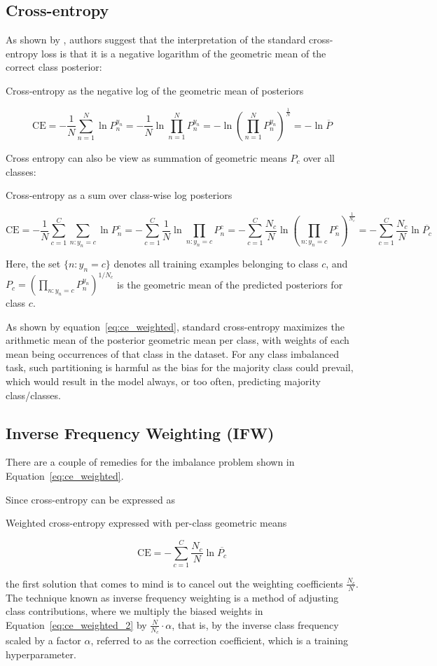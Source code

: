 \subsection{Cross-entropy}
As shown by \cite{dynamic_loss_balancing}, authors suggest that the interpretation of the standard cross-entropy loss is that it is a negative logarithm of the geometric mean of the correct class posterior:
\begin{myequation}
\caption{Cross-entropy as the negative log of the geometric mean of posteriors}
\label{eq:ce_geom}
\[
\text{CE} = -\frac{1}{N} \sum_{n=1}^{N} \ln P_n^{y_n} 
= -\frac{1}{N} \ln \prod_{n=1}^{N} P_n^{y_n} 
= -\ln \left( \prod_{n=1}^{N} P_n^{y_n} \right)^{\frac{1}{N}} 
= -\ln \overline{P}
\]
\end{myequation}


Cross entropy can also be view as summation of geometric means $P_c$ over all classes:
\begin{myequation}
\caption{Cross-entropy as a sum over class-wise log posteriors}
\label{eq:ce_weighted}
\[
\text{CE} = -\frac{1}{N} \sum_{c=1}^{C} \sum_{n: y_n = c} \ln P_n^c 
= -\sum_{c=1}^{C} \frac{1}{N} \ln \prod_{n: y_n = c} P_n^c 
= -\sum_{c=1}^{C} \frac{N_c}{N} \ln \left( \prod_{n: y_n = c} P_n^c \right)^{\frac{1}{N_c}} 
= -\sum_{c=1}^{C} \frac{N_c}{N} \ln \overline{P_c}
\]
\end{myequation}

Here, the set $\{n : y_n = c\}$ denotes all training examples belonging to class $c$, and $P_c = \left( \prod_{n: y_n = c} P_n^{y_n} \right)^{1/N_c}$ is the geometric mean of the predicted posteriors for class $c$.

As shown by equation~\eqref{eq:ce_weighted}, standard cross-entropy maximizes the arithmetic mean of the posterior geometric mean per class, with weights of each mean being occurrences of that class in the dataset. For any class imbalanced task, such partitioning is harmful as the bias for the majority class could prevail, which would result in the model always, or too often, predicting majority class/classes.


\subsection{Inverse Frequency Weighting (IFW)}

There are a couple of remedies for the imbalance problem shown in Equation~\eqref{eq:ce_weighted}.

Since cross-entropy can be expressed as
\begin{myequation}
\caption{Weighted cross-entropy expressed with per-class geometric means}
\label{eq:ce_weighted_2}
\[
\text{CE} = -\sum_{c=1}^{C} \frac{N_c}{N} \ln \overline{P_c}
\]
\end{myequation}
the first solution that comes to mind is to cancel out the weighting coefficients $\frac{N_c}{N}$. The technique known as inverse frequency weighting is a method of adjusting class contributions, where we multiply the biased weights in Equation~\eqref{eq:ce_weighted_2} by $\frac{N}{N_c} \cdot \alpha$, that is, by the inverse class frequency scaled by a factor $\alpha$, referred to as the correction coefficient, which is a training hyperparameter.

